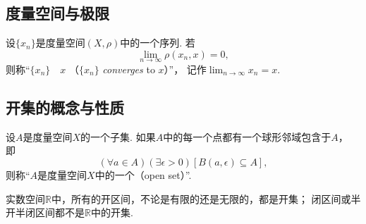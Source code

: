 \subsection{度量空间与极限}
\begin{definition}
设\(\{x_n\}\)是度量空间\((X,\rho)\)中的一个序列.
若\[
	\lim_{n\to\infty} \rho(x_n,x) = 0,
\]
则称“\(\{x_n\}\)~~\(x\)%
（\(\{x_n\}\) \emph{converges} to \(x\)）”，
记作\(\lim_{n\to\infty} x_n = x\).
\end{definition}

\subsection{开集的概念与性质}
\begin{definition}\label{definition:度量空间.开集的概念}
设\(A\)是度量空间\(X\)的一个子集.
如果\(A\)中的每一个点都有一个球形邻域包含于\(A\)，
即\[
	(\forall a \in A)
	(\exists\epsilon>0)
	[B(a,\epsilon) \subseteq A],
\]
则称“\(A\)是度量空间\(X\)中的一个（open set）”.
\end{definition}

\begin{example}
实数空间\(\mathbb{R}\)中，所有的开区间，不论是有限的还是无限的，都是开集；
闭区间或半开半闭区间都不是\(\mathbb{R}\)中的开集.
\end{example}


